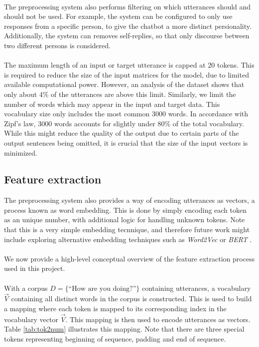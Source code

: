 \documentclass{article}
\begin{document}
\paragraph{}
The preprocessing system also performs filtering on which utterances should
and should not be used. For example, the system can be configured to only
use responses from a specific person, to give the chatbot a more distinct
persionality. Additionally, the system can removes self-replies, so that
only discourse between two different persons is considered.

\paragraph{}
The maximum length of an input or target utterance is capped at 20 tokens.
This is required to reduce the size of the input matrices for the model, due
to limited available computational power. However, an analysis of the dataset
shows that only about 4\% of the utterances are above this limit. Similarly,
we limit the number of words which may appear in the input and target data.
This vocabulary size only includes the most common 3000 words. In accordance
with Zipf's law, 3000 words accounts for slightly under 80\% of the total
vocabulary. While this might reduce the quality of the output due to certain
parts of the output sentences being omitted, it is crucial that the size of
the input vectors is minimized.

\subsection{Feature extraction}

The preprocessing system also provides a way of encoding utterances as
vectors, a process known as word embedding. This is done by simply
encoding each token as an unique number, with additional logic for handling
unknown tokens. Note that this is a very simple embedding tecnnique, and
therefore future work might include exploring alternative embedding techniques
such as \emph{Word2Vec} \cite{word2vec} or \emph{BERT} \cite{bert2018}.

\paragraph{}
We now provide a high-level conceptual overview of the feature extraction
process used in this project.

\paragraph{}
With a corpus $D = \{\text{``How are you doing?''}\}$ containing utterances, 
a vocabulary $\vec{V}$ containing all distinct words in the corpus is
constructed. This is used to build a mapping where each token is mapped to
its corresponding index in the vocabulary vector $\vec{V}$. This mapping is
then used to encode utterances as vectors. Table \ref{tab:tok2num} illustrates
this mapping. Note that there are three special tokens representing beginning
of sequence, padding and end of sequence.
\end{document}
